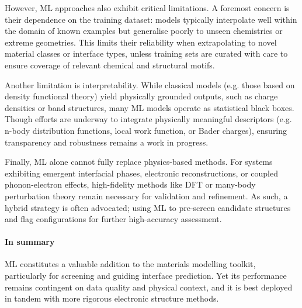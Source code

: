 However, ML approaches also exhibit critical limitations. A foremost concern is their dependence on the training dataset: models typically interpolate well within the domain of known examples but generalise poorly to unseen chemistries or extreme geometries. This limits their reliability when extrapolating to novel material classes or interface types, unless training sets are curated with care to ensure coverage of relevant chemical and structural motifs.

Another limitation is interpretability. While classical models (e.g. those based on density functional theory) yield physically grounded outputs, such as charge densities or band structures, many ML models operate as statistical black boxes. Though efforts are underway to integrate physically meaningful descriptors (e.g. n-body distribution functions, local work function, or Bader charges), ensuring transparency and robustness remains a work in progress.

Finally, ML alone cannot fully replace physics-based methods. For systems exhibiting emergent interfacial phases, electronic reconstructions, or coupled phonon-electron effects, high-fidelity methods like DFT or many-body perturbation theory remain necessary for validation and refinement. As such, a hybrid strategy is often advocated; using ML to pre-screen candidate structures and flag configurations for further high-accuracy assessment.

\paragraph{In summary} ML constitutes a valuable addition to the materials modelling toolkit, particularly for screening and guiding interface prediction. Yet its performance remains contingent on data quality and physical context, and it is best deployed in tandem with more rigorous electronic structure methods.